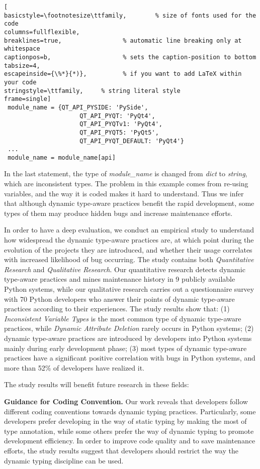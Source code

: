 \begin{lstlisting}[ 
basicstyle=\footnotesize\ttfamily,        % size of fonts used for the code
columns=fullflexible,
breaklines=true,                 % automatic line breaking only at whitespace
captionpos=b,                    % sets the caption-position to bottom
tabsize=4,
escapeinside={\%*}{*)},          % if you want to add LaTeX within your code
stringstyle=\ttfamily,     % string literal style
frame=single]
 module_name = {QT_API_PYSIDE: 'PySide',
					 QT_API_PYQT: 'PyQt4',
					 QT_API_PYQTv1: 'PyQt4',
					 QT_API_PYQT5: 'PyQt5',
					 QT_API_PYQT_DEFAULT: 'PyQt4'}
 ...
 module_name = module_name[api]
\end{lstlisting}

\noindent In the last statement, the type of \emph{module\_name} is changed from \textit{dict} to \textit{string}, which are inconsistent types. The problem in this example comes from re-using variables, and the way it is coded makes it hard to understand. Thus we infer that although dynamic type-aware practices benefit the rapid development\cite{b19}, some types of them may produce hidden bugs and increase maintenance efforts. 

In order to have a deep evaluation, we conduct an empirical study to understand how widespread the dynamic type-aware practices are, at which point during the evolution of the projects they are introduced, and whether their usage correlates with increased likelihood of bug occurring. The study contains both \emph{Quantitative Research} and \emph{Qualitative Research}. Our quantitative research detects dynamic type-aware practices and mines maintenance history in 9 publicly available Python systems, while our qualitative research carries out a questionnaire survey with 70 Python developers who answer their points of dynamic type-aware practices according to their experiences. The study results show that: (1) \emph{Inconsistent Variable Types} is the most common type of dynamic type-aware practices, while \emph{Dynamic Attribute Deletion} rarely occurs in Python systems; (2) dynamic type-aware practices are introduced by developers into Python systems mainly during early development phase; (3) most types of dynamic type-aware practices have a significant positive correlation with bugs in Python systems, and more than 52\% of developers have realized it.

The study results will benefit future research in these fields:

\textbf{Guidance for Coding Convention.} Our work reveals that developers follow different coding conventions towards dynamic typing practices. Particularly, some developers prefer developing in the way of static typing by making the most of type annotation, while some others prefer the way of dynamic typing to promote development efficiency. In order to improve code quality and to save maintenance efforts, the study results suggest that developers should restrict the way the dynamic typing discipline can be used.

